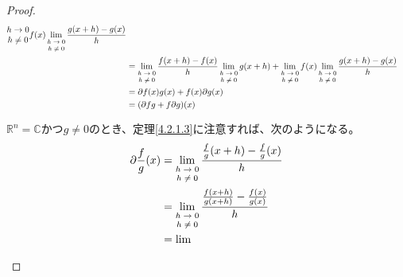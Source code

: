 \documentclass[dvipdfmx]{jsarticle}
\begin{document}
\begin{proof}
\begin{align*}
{\begin{matrix}
h \rightarrow 0 \\
h \neq 0 \\
\end{matrix}}{f(x)}\lim_{\scriptsize \begin{matrix}
h \rightarrow 0 \\
h \neq 0 \\
\end{matrix}}\frac{g(x + h) - g(x)}{h}\\
&= \lim_{\scriptsize \begin{matrix}
h \rightarrow 0 \\
h \neq 0 \\
\end{matrix}}\frac{f(x + h) - f(x)}{h}\lim_{\scriptsize \begin{matrix}
h \rightarrow 0 \\
h \neq 0 \\
\end{matrix}}{g(x + h)} + \lim_{\scriptsize \begin{matrix}
h \rightarrow 0 \\
h \neq 0 \\
\end{matrix}}{f(x)}\lim_{\scriptsize \begin{matrix}
h \rightarrow 0 \\
h \neq 0 \\
\end{matrix}}\frac{g(x + h) - g(x)}{h}\\
&= \partial f(x)g(x) + f(x)\partial g(x)\\
&= (\partial fg + f\partial g)(x)
\end{align*}\par
$\mathbb{R}^{n} = \mathbb{C}$かつ$g \neq 0$のとき、定理\ref{4.2.1.3}に注意すれば、次のようになる。
\begin{align*}
\partial\frac{f}{g}(x) &= \lim_{\scriptsize \begin{matrix}
h \rightarrow 0 \\
h \neq 0 \\
\end{matrix}}\frac{\frac{f}{g}(x + h) - \frac{f}{g}(x)}{h}\\
&= \lim_{\scriptsize \begin{matrix}
h \rightarrow 0 \\
h \neq 0 \\
\end{matrix}}\frac{\frac{f(x + h)}{g(x + h)} - \frac{f(x)}{g(x)}}{h}\\
&= \lim_{\scriptsize \begin{matrix}

\end{matrix}}
\end{align*}
\end{proof}
\end{document}
